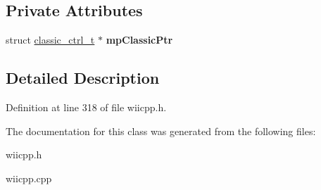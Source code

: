 \subsection*{\-Private \-Attributes}
\begin{DoxyCompactItemize}
\item 
\hypertarget{class_c_classic_a6fd9bbfe830df5a3daed2c912b593f02}{struct \hyperlink{structclassic__ctrl__t}{classic\-\_\-ctrl\-\_\-t} $\ast$ {\bfseries mp\-Classic\-Ptr}}\label{class_c_classic_a6fd9bbfe830df5a3daed2c912b593f02}

\end{DoxyCompactItemize}


\subsection{\-Detailed \-Description}


\-Definition at line 318 of file wiicpp.\-h.



\-The documentation for this class was generated from the following files\-:\begin{DoxyCompactItemize}
\item 
wiicpp.\-h\item 
wiicpp.\-cpp\end{DoxyCompactItemize}
